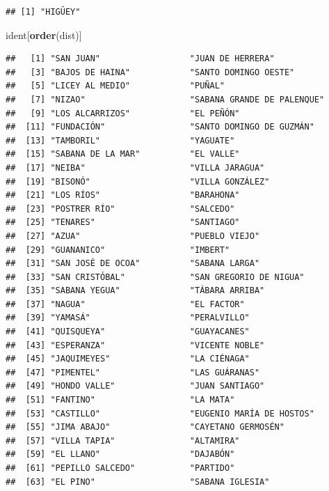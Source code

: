 \documentclass[11pt,]{article}
\newenvironment{Shaded}{\begin{snugshade}}{\end{snugshade}}
\newcommand{\KeywordTok}[1]{\textcolor[rgb]{0.13,0.29,0.53}{\textbf{#1}}}
\newcommand{\NormalTok}[1]{#1}
\begin{document}
\begin{verbatim}
## [1] "HIGÜEY"
\end{verbatim}

\begin{Shaded}
\begin{Highlighting}[]
\NormalTok{ident[}\KeywordTok{order}\NormalTok{(dist)]}
\end{Highlighting}
\end{Shaded}

\begin{verbatim}
##   [1] "SAN JUAN"                  "JUAN DE HERRERA"          
##   [3] "BAJOS DE HAINA"            "SANTO DOMINGO OESTE"      
##   [5] "LICEY AL MEDIO"            "PUÑAL"                    
##   [7] "NIZAO"                     "SABANA GRANDE DE PALENQUE"
##   [9] "LOS ALCARRIZOS"            "EL PEÑÓN"                 
##  [11] "FUNDACIÓN"                 "SANTO DOMINGO DE GUZMÁN"  
##  [13] "TAMBORIL"                  "YAGUATE"                  
##  [15] "SABANA DE LA MAR"          "EL VALLE"                 
##  [17] "NEIBA"                     "VILLA JARAGUA"            
##  [19] "BISONÓ"                    "VILLA GONZÁLEZ"           
##  [21] "LOS RÍOS"                  "BARAHONA"                 
##  [23] "POSTRER RÍO"               "SALCEDO"                  
##  [25] "TENARES"                   "SANTIAGO"                 
##  [27] "AZUA"                      "PUEBLO VIEJO"             
##  [29] "GUANANICO"                 "IMBERT"                   
##  [31] "SAN JOSÉ DE OCOA"          "SABANA LARGA"             
##  [33] "SAN CRISTÓBAL"             "SAN GREGORIO DE NIGUA"    
##  [35] "SABANA YEGUA"              "TÁBARA ARRIBA"            
##  [37] "NAGUA"                     "EL FACTOR"                
##  [39] "YAMASÁ"                    "PERALVILLO"               
##  [41] "QUISQUEYA"                 "GUAYACANES"               
##  [43] "ESPERANZA"                 "VICENTE NOBLE"            
##  [45] "JAQUIMEYES"                "LA CIÉNAGA"               
##  [47] "PIMENTEL"                  "LAS GUÁRANAS"             
##  [49] "HONDO VALLE"               "JUAN SANTIAGO"            
##  [51] "FANTINO"                   "LA MATA"                  
##  [53] "CASTILLO"                  "EUGENIO MARÍA DE HOSTOS"  
##  [55] "JIMA ABAJO"                "CAYETANO GERMOSÉN"        
##  [57] "VILLA TAPIA"               "ALTAMIRA"                 
##  [59] "EL LLANO"                  "DAJABÓN"                  
##  [61] "PEPILLO SALCEDO"           "PARTIDO"                  
##  [63] "EL PINO"                   "SABANA IGLESIA"           

\end{verbatim}
\end{document}
